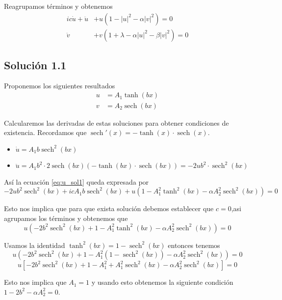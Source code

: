 \documentclass[letterpaper,11pt]{exam}
\newcommand{\sech}{\operatorname{sech}}
\theoremstyle{plain}
\begin{document}
Reagrupamos términos y obtenemos
\begin{align}
     ic\dot{u}+\ddot{u}&+u(1-|u|^2-\alpha|v|^2)=0 \label{eq:u_sol1} \\
    \ddot{v}&+v (1+\lambda-\alpha |u|^2-\beta|v|^2)=0 \label{eq:v_sol1}
\end{align}

\subsection{Solución 1.1}\label{sec:sol11}
Proponemos los siguientes resultados
\begin{align*}
    u&=A_1 \tanh(bx)\\
    v&=A_2 \sech(bx)
\end{align*}

Calcularemos las derivadas de estas soluciones para obtener condiciones de existencia. Recordamos que $\sech'(x)=-\tanh(x)\cdot \sech(x)$.

\begin{itemize}
    \item $\dot{u}=A_1 b \sech^2(bx)$
    \item $\ddot{u}=A_1 b^2 \cdot 2 \sech(bx)(-\tanh(bx)\cdot \sech(bx)) = -2ub^2\cdot \sech^2(bx)$
\end{itemize}

Así la ecuación \eqref{eq:u_sol1} queda expresada por
\begin{equation*}
    -2ub^2\sech^2(bx)+icA_1b\sech^2(bx)+u(1-A_1^2\tanh^2(bx)-\alpha A_2^2\sech^2(bx))=0
\end{equation*}

Esto nos implica que para que exista solución debemos establecer que $c=0$,asi agrupamos los términos y obtenemos que
\begin{equation*}
    u(-2b^2\sech^2(bx)+1-A_1^2\tanh^2(bx)-\alpha A_2^2\sech^2(bx))=0
\end{equation*}

Usamos la identidad $\tanh^2(bx)=1-\sech^2(bx)$ entonces tenemos
\begin{equation*}
    u(-2b^2\sech^2(bx)+1-A_1^2(1-\sech^2(bx))-\alpha A_2^2\sech^2(bx))=0
\end{equation*}
\begin{equation*}
    u[-2b^2\sech^2(bx)+1-A_1^2+A_1^2\sech^2(bx)-\alpha A_2^2\sech^2(bx)]=0
\end{equation*}

Esto nos implica que $A_1=1$ y usando esto obtenemos la siguiente condición $1-2b^2-\alpha A_2^2=0$.
\end{document}
